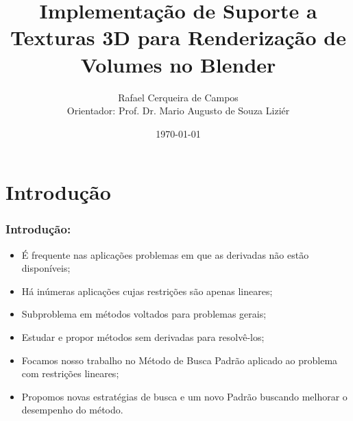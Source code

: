 \documentclass{beamer}
\title[Defesa]{Implementação de Suporte a Texturas 3D para Renderização de
Volumes no Blender}
\author[Rafael Campos]{Rafael Cerqueira de Campos \\ Orientador: Prof. Dr. Mario Augusto de Souza Liziér}
\institute[DC - UFSCAR]{Graduação em Engenharia de Computação - UFSCar}
\date{\today}
\begin{document}
\frame{\titlepage}

\AtBeginSubsection[]

\begin{frame}[allowframebreaks]
\tableofcontents
\end{frame}

\section{Introdu\c{c}\~ao}

\begin{frame}

\frametitle{Introdu\c{c}\~ao:}

\begin{itemize}

\item \'E frequente nas aplica\c{c}\~oes problemas em que as derivadas n\~ao est\~ao dispon\'iveis;
\item H\'a in\'umeras aplica\c{c}\~oes cujas restri\c{c}\~oes s\~ao apenas lineares;
\item Subproblema em m\'etodos voltados para problemas gerais;
\item Estudar e propor m\'etodos sem derivadas para resolv\^e-los;
\item Focamos nosso trabalho no M\'etodo de Busca Padr\~ao aplicado ao problema com restri\c{c}\~oes lineares;
\item Propomos novas estrat\'egias de busca e um novo Padr\~ao buscando melhorar o desempenho do m\'etodo.

\end{itemize}

\end{frame}
\end{document}
